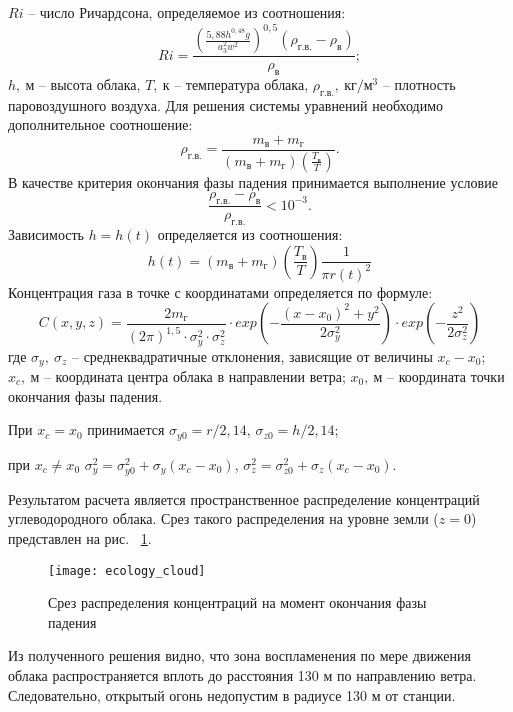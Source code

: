 $Ri$ – число Ричардсона, определяемое из соотношения:
$$
Ri = \frac{
\left(
\frac{
5,88h^{0,48}g
}{
a_3^2 w^2
}
\right)^{0,5}
(\rho_{г.в.} - \rho_в)
}{\rho_в};
$$
$h, \ м$ – высота облака, $T, \ к$ – температура облака, $\rho_{г.в.}, \ кг/м^3$ – плотность паровоздушного воздуха.
Для решения системы уравнений необходимо дополнительное соотношение:
$$
\rho_{г.в.} = \frac{
m_в + m_г
}{
\left(
m_в + m_г
\right)
\left(
\frac{T_в}{T}
\right)
}.
$$
В качестве критерия окончания фазы падения принимается выполнение условие
$$
\frac{\rho_{г.в.} - \rho_в}{\rho_{г.в.}} < 10^{-3}.
$$
Зависимость $h=h(t)$ определяется из соотношения:
$$
h(t) = \left(
m_в + m_г
\right)
\left(
\frac{T_в}{T}
\right)
\frac{
1
}{
\pi r(t)^2
}
$$
Концентрация газа в точке с координатами  определяется по формуле:
$$
C(x, y, z) = \frac{
2m_г
}{
(2\pi)^{1,5} \cdot \sigma_y^2 \cdot \sigma_z^2
} \cdot
exp\left(
-\frac{
(x - x_0)^2 + y^2
}{
2\sigma_y^2
}
\right) \cdot
exp\left(
-\frac{
z^2
}{
2\sigma_z^2
}
\right)
$$
где $\sigma_y, \ \sigma_z$ – среднеквадратичные отклонения, зависящие от величины $x_c - x_0$; $x_c, \ м$ – координата центра облака в направлении ветра; $x_0, \ м$ – координата точки окончания фазы падения.

При $x_c = x_0$ принимается $\sigma_{y0}=r/2,14$, $\sigma_{z0}=h/2,14$;

при $x_c \neq x_0$ $\sigma_y^2 = \sigma_{y0}^2 + \sigma_y(x_c - x_0)$, $\sigma_z^2 = \sigma_{z0}^2 + \sigma_z(x_c - x_0)$.

Результатом расчета является пространственное распределение концентраций углеводородного облака. Срез такого
распределения на уровне земли ($z=0$) представлен на рис. ~\ref{img:ecology_cloud}.

\begin{figure}[H]
	\centering
	\texttt{[image: ecology\_cloud]}
	\caption{Срез распределения концентраций на момент окончания фазы падения}
	\label{img:ecology_cloud}
\end{figure}

Из полученного решения видно, что зона воспламенения по мере движения облака распространяется вплоть до расстояния 130 м по направлению ветра. Следовательно, открытый огонь недопустим в радиусе 130 м от станции.
